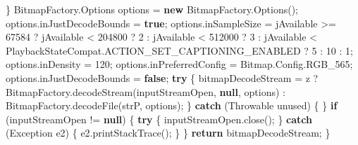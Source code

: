 \documentclass[
]{article}
\newenvironment{Shaded}{}{}
\newcommand{\BuiltInTok}[1]{\textcolor[rgb]{0.00,0.50,0.00}{#1}}
\newcommand{\ControlFlowTok}[1]{\textcolor[rgb]{0.00,0.44,0.13}{\textbf{#1}}}
\newcommand{\DecValTok}[1]{\textcolor[rgb]{0.25,0.63,0.44}{#1}}
\newcommand{\FunctionTok}[1]{\textcolor[rgb]{0.02,0.16,0.49}{#1}}
\newcommand{\KeywordTok}[1]{\textcolor[rgb]{0.00,0.44,0.13}{\textbf{#1}}}
\newcommand{\NormalTok}[1]{#1}
\newcommand{\OperatorTok}[1]{\textcolor[rgb]{0.40,0.40,0.40}{#1}}
\begin{document}
\begin{Shaded}
\begin{Highlighting}[]
        \OperatorTok{\}}
\NormalTok{        BitmapFactory}\OperatorTok{.}\FunctionTok{Options}\NormalTok{ options }\OperatorTok{=} \KeywordTok{new}\NormalTok{ BitmapFactory}\OperatorTok{.}\FunctionTok{Options}\OperatorTok{();}
\NormalTok{        options}\OperatorTok{.}\FunctionTok{inJustDecodeBounds} \OperatorTok{=} \KeywordTok{true}\OperatorTok{;}
\NormalTok{        options}\OperatorTok{.}\FunctionTok{inSampleSize} \OperatorTok{=}\NormalTok{ jAvailable }\OperatorTok{\textgreater{}=} \DecValTok{67584} \OperatorTok{?}\NormalTok{ jAvailable }\OperatorTok{\textless{}} \DecValTok{204800} \OperatorTok{?} \DecValTok{2} \OperatorTok{:}\NormalTok{ jAvailable }\OperatorTok{\textless{}} \DecValTok{512000} \OperatorTok{?} \DecValTok{3} \OperatorTok{:}\NormalTok{ jAvailable }\OperatorTok{\textless{}}\NormalTok{ PlaybackStateCompat}\OperatorTok{.}\FunctionTok{ACTION\_SET\_CAPTIONING\_ENABLED} \OperatorTok{?} \DecValTok{5} \OperatorTok{:} \DecValTok{10} \OperatorTok{:} \DecValTok{1}\OperatorTok{;}
\NormalTok{        options}\OperatorTok{.}\FunctionTok{inDensity} \OperatorTok{=} \DecValTok{120}\OperatorTok{;}
\NormalTok{        options}\OperatorTok{.}\FunctionTok{inPreferredConfig} \OperatorTok{=}\NormalTok{ Bitmap}\OperatorTok{.}\FunctionTok{Config}\OperatorTok{.}\FunctionTok{RGB\_565}\OperatorTok{;}
\NormalTok{        options}\OperatorTok{.}\FunctionTok{inJustDecodeBounds} \OperatorTok{=} \KeywordTok{false}\OperatorTok{;}
        \ControlFlowTok{try} \OperatorTok{\{}
\NormalTok{            bitmapDecodeStream }\OperatorTok{=}\NormalTok{ z }\OperatorTok{?}\NormalTok{ BitmapFactory}\OperatorTok{.}\FunctionTok{decodeStream}\OperatorTok{(}\NormalTok{inputStreamOpen}\OperatorTok{,} \KeywordTok{null}\OperatorTok{,}\NormalTok{ options}\OperatorTok{)} \OperatorTok{:}\NormalTok{ BitmapFactory}\OperatorTok{.}\FunctionTok{decodeFile}\OperatorTok{(}\NormalTok{strP}\OperatorTok{,}\NormalTok{ options}\OperatorTok{);}
        \OperatorTok{\}} \ControlFlowTok{catch} \OperatorTok{(}\BuiltInTok{Throwable}\NormalTok{ unused}\OperatorTok{)} \OperatorTok{\{}
        \OperatorTok{\}}
        \ControlFlowTok{if} \OperatorTok{(}\NormalTok{inputStreamOpen }\OperatorTok{!=} \KeywordTok{null}\OperatorTok{)} \OperatorTok{\{}
            \ControlFlowTok{try} \OperatorTok{\{}
\NormalTok{                inputStreamOpen}\OperatorTok{.}\FunctionTok{close}\OperatorTok{();}
            \OperatorTok{\}} \ControlFlowTok{catch} \OperatorTok{(}\BuiltInTok{Exception}\NormalTok{ e2}\OperatorTok{)} \OperatorTok{\{}
\NormalTok{                e2}\OperatorTok{.}\FunctionTok{printStackTrace}\OperatorTok{();}
            \OperatorTok{\}}
        \OperatorTok{\}}
        \ControlFlowTok{return}\NormalTok{ bitmapDecodeStream}\OperatorTok{;}
    \OperatorTok{\}}


\end{Highlighting}
\end{Shaded}
\end{document}
